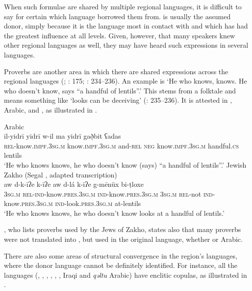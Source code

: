 \documentclass[output=paper]{langsci/langscibook}
\begin{document}
When such formulae are shared by multiple regional languages, it is difficult to say for certain which language  borrowed them from.  is usually the assumed donor, simply because it is the language most in contact with  and which has had the greatest influence at all levels. Given, however, that many speakers knew other regional languages as well, they may have heard such expressions in several languages.

Proverbs are another area in which there are shared expressions across the regional languages (\citealt{Segal1955}; \citealt{Garbell1965}: 175; \citealt{Chyet1995}: 234–236). An example is ‘He who knows, knows. He who doesn’t know, says “a handful of lentils”.’ This stems from a folktale and means something like ‘looks can be deceiving’ (\citealt{Chyet1995}: 235–236). It is attested in ,  Arabic, and , as illustrated in .

\ea\label{bkm:Ref534225045} Arabic \citep[235]{Chyet1995} \\
\gll il-yidrī   yidrī     w-il ma yidrī     gað̣bit ʕadas\\
    \textsc{rel}\textup{{}-know.}\textsc{impf.3sg.m} \textup{know.}\textsc{impf.3sg.m} \textup{and-}\textsc{rel} \textsc{neg} \textup{know.}\textsc{impf.3sg.m} handful\textsc{.cs} lentils\\
\glt ‘He who knows knows, he who doesn’t know (says) “a handful of lentils”.’
\ex\label{bkm:Ref534225057}Jewish Zakho  (Segal \citeyear[262]{Segal1955}, adapted transcription)\\
\gll aw d-k-īʔe   k-īʔe     aw d-lá k-īʔe   g-mēnüx bi-ṭloxe\\
    \textsc{3sg.m} \textsc{rel}\textup{{}-}\textsc{ind-}\textup{know}\textsc{.pres.3sg.m} \textsc{ind}\textup{{}-know.}\textsc{pres.3sg.m} \textsc{3sg.m} \textsc{rel}\textup{{}-not} \textsc{ind}\textup{{}-know.}\textsc{pres.3sg.m} \textsc{ind-}\textup{look.}\textsc{pres}.\textsc{3sg.m} \textup{at-lentils}\\
\glt ‘He who knows knows, he who doesn’t know looks at a handful of lentils.’\z

\citet{Sabar1978}, who lists proverbs used by the {Jews} of Zakho, states also that many proverbs were not translated into , but used in the original language, whether  or Arabic.

There are also some areas of structural {convergence} in the region’s languages, where the donor language cannot be definitely identified. For instance, all the languages (, , , , , , Iraqi  and \textit{qəltu} Arabic) have enclitic copulas, as illustrated in .
\end{document}
